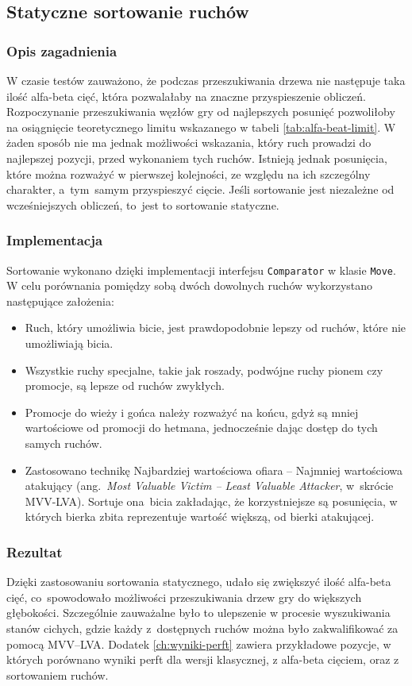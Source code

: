 \subsection{Statyczne sortowanie ruchów}
\label{subsec:sortowanie-ruchow}

\subsubsection{Opis zagadnienia}
W czasie testów zauważono, że podczas przeszukiwania drzewa nie następuje taka ilość alfa-beta cięć, która pozwalałaby na znaczne przyspieszenie obliczeń.
Rozpoczynanie przeszukiwania węzłów gry od najlepszych posunięć pozwoliłoby na osiągnięcie teoretycznego limitu wskazanego w tabeli \ref{tab:alfa-beat-limit}.
W żaden sposób nie ma jednak możliwości wskazania, który ruch prowadzi do najlepszej pozycji, przed wykonaniem tych ruchów.
Istnieją jednak posunięcia, które można rozważyć w pierwszej kolejności, ze względu na ich szczególny charakter, a~tym~samym przyspieszyć cięcie.
Jeśli sortowanie jest niezależne od wcześniejszych obliczeń, to~jest to sortowanie statyczne.

\subsubsection{Implementacja}
Sortowanie wykonano dzięki implementacji interfejsu \texttt{Comparator} w klasie \texttt{Move}.
W celu porównania pomiędzy sobą dwóch dowolnych ruchów wykorzystano następujące założenia:
\begin{itemize}
    \item Ruch, który umożliwia bicie, jest prawdopodobnie lepszy od ruchów, które nie umożliwiają bicia.
    \item Wszystkie ruchy specjalne, takie jak roszady, podwójne ruchy pionem czy promocje, są lepsze od ruchów zwykłych.
    \item Promocje do wieży i gońca należy rozważyć na końcu, gdyż są mniej wartościowe od promocji do hetmana, jednocześnie dając dostęp do tych samych ruchów.
    \item Zastosowano technikę Najbardziej wartościowa ofiara – Najmniej wartościowa atakujący (ang.~\emph{Most Valuable Victim – Least Valuable Attacker}, w~skrócie MVV-LVA). Sortuje ona~bicia zakładając, że korzystniejsze są posunięcia, w których bierka zbita reprezentuje wartość większą, od bierki atakującej.
\end{itemize}

\subsubsection{Rezultat}
Dzięki zastosowaniu sortowania statycznego, udało się zwiększyć ilość alfa-beta cięć, co~spowodowało możliwości przeszukiwania drzew gry do większych głębokości.
Szczególnie zauważalne było to ulepszenie w procesie wyszukiwania stanów cichych, gdzie każdy z~dostępnych ruchów można było zakwalifikować za pomocą MVV–LVA.
Dodatek \ref{ch:wyniki-perft} zawiera przykładowe pozycje, w których porównano wyniki perft dla wersji klasycznej, z alfa-beta cięciem, oraz z sortowaniem ruchów.